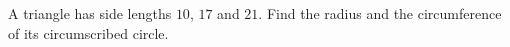 A triangle has side lengths $10$, $17$ and $21$. Find the radius and the circumference of its circumscribed circle.
